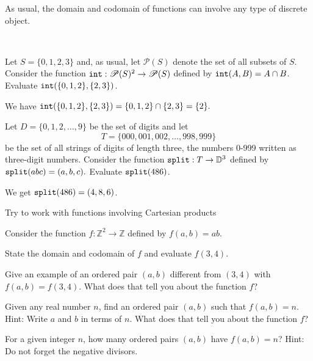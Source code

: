 As usual, the domain and codomain of functions can involve any type of discrete object.

\begin{exam}
\label{exam_cart_prod_fn_discrete}
~
    \begin{apart}
        \item Let $S = \{0,1,2,3\}$ and, as usual, let $\mathscr{P}(S)$ denote the set of all subsets of $S$. Consider the function $\texttt{int}: \mathscr{P}(S)^2 \to \mathscr{P}(S)$ defined by $\texttt{int}(A,B) = A \cap B$.  Evaluate $\texttt{int}(\{0,1,2\},\{2,3\})$.
            \begin{soln}
                We have $\texttt{int}(\{0,1,2\},\{2,3\}) = \{0,1,2\} \cap \{2,3\} = \{2\}.$
            \end{soln}
        
        \item Let $D=\{0,1,2,\ldots,9\}$ be the set of digits and let $$T=\{000,001,002,\ldots, 998, 999\}$$ be the set of all strings of digits of length three, the numbers 0-999 written as three-digit numbers. Consider the function $\texttt{split}:T \to \mathbb{D}^3$ defined by $\texttt{split}(abc)= (a,b,c).$  Evaluate $\texttt{split}(486)$.
            \begin{soln}
                We get $\texttt{split}(486)=(4,8,6)$.
            \end{soln}
    \end{apart}
\end{exam}

Try to work with functions involving Cartesian products

\begin{act}
\label{act_fn_cart_prod}
    Consider the function $f: \mathbb{Z}^2 \to \mathbb{Z}$ defined by $f(a,b) = ab$. 
    \begin{actpart}
      \item State the domain and codomain of $f$ and evaluate $f(3,4)$.
      \item \label{part_another_pair_mult12} Give an example of an ordered pair $(a,b)$ different from $(3,4)$ with $f(a,b) = f(3,4)$.  What does that tell you about the function $f$?
      \item \label{part_mult_onto} Given any real number $n$, find an ordered pair $(a,b)$ such that $f(a,b)=n$.  Hint: Write $a$ and $b$ in terms of $n$. What does that tell you about the function $f$?
      \item For a given integer $n$, how many ordered pairs $(a,b)$ have $f(a,b)=n$?  Hint: Do not forget the negative divisors. 
    \end{actpart}
\end{act}

